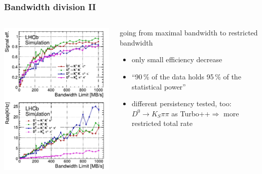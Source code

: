 \documentclass[table,xcolor=dvipsnames,professionalfonts]{beamer}
\begin{document}
\begin{frame}
  \frametitle{Bandwidth division II}
  \begin{columns}
    \begin{column}{.5\textwidth}
  \includegraphics[width=\textwidth]{./BW-trend.pdf}
    \end{column}
    \begin{column}{.5\textwidth}
      going from maximal bandwidth to restricted bandwidth
      \begin{itemize}
      \item only small efficiency decrease
      \item ``90\,\% of the data holds 95\,\% of the statistical power''
      \item different persistency tested, too:\newline $D^0\to K_S\pi\pi$ as Turbo++\newline$\Rightarrow$ more restricted total rate
      \end{itemize}
    \end{column}
    \end{columns}
  \end{frame}
\end{document}
